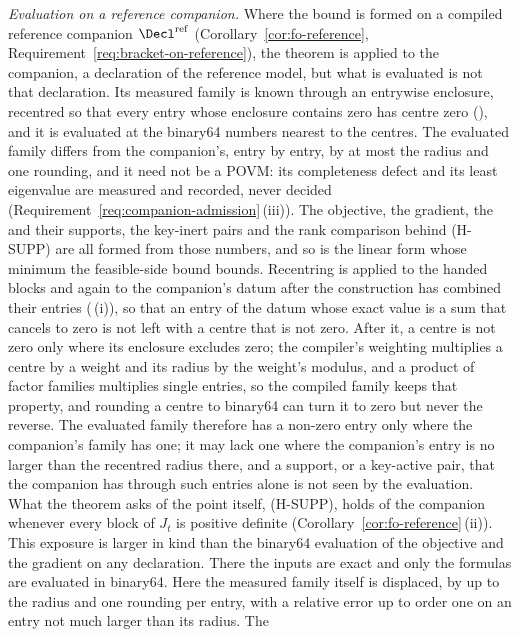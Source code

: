 \begin{remark}
\emph{Evaluation on a reference companion.} Where the bound is formed on a
compiled reference companion $\Decl^{\mathrm{ref}}$
(Corollary~\ref{cor:fo-reference},
Requirement~\ref{req:bracket-on-reference}), the theorem is applied to the
companion, a declaration of the reference model, but what is evaluated is
not that declaration. Its measured family is known through an entrywise
enclosure, recentred so that every entry whose enclosure contains zero has
centre zero (), and it is
evaluated at the binary64 numbers nearest to the centres. The evaluated
family differs from the companion's, entry by entry, by at most the radius
and one rounding, and it need not be a POVM: its completeness defect and its
least eigenvalue are measured and recorded, never decided
(Requirement~\ref{req:companion-admission}\,(iii)). The objective, the
gradient, the  and their supports, the key-inert pairs and the
rank comparison behind (H-SUPP) are all formed from those numbers, and so is
the linear form whose minimum the feasible-side bound bounds. Recentring is
applied to the handed
blocks and again to the companion's datum after the construction has
combined their entries (\,(i)), so
that an entry of the datum whose exact value is a sum that cancels to zero
is not left with a centre that is not zero. After it, a centre is not zero
only where its enclosure excludes zero; the compiler's weighting multiplies
a centre by a weight and its radius by the weight's modulus, and a product of
factor families multiplies single entries, so the compiled family keeps that
property, and rounding a centre to binary64 can turn it to zero but never
the reverse. The evaluated family therefore has a non-zero entry only where
the companion's family has one; it may lack one where the companion's entry
is no larger than the recentred radius there, and a support,
or a key-active pair, that the companion has through such entries alone is
not seen by the evaluation. What the theorem asks of the point itself,
(H-SUPP), holds of the companion whenever every block of $J_t$ is positive
definite (Corollary~\ref{cor:fo-reference}\,(ii)). This exposure is
larger in kind than the binary64 evaluation of the objective and the
gradient on any declaration. There the inputs are exact and only the
formulas are evaluated in binary64. Here the measured family itself is
displaced, by up to the radius and one rounding per entry, with a relative
error up to order one on an entry not much larger than its radius. The

\end{remark}
